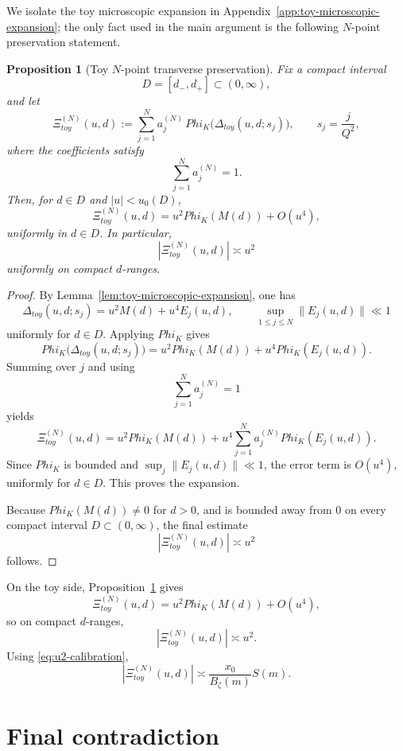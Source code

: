 \documentclass[11pt,a4paper]{amsart}
\def\Phi{Phi}%
\def\toy{toy}%
\theoremstyle{plain}
\newtheorem{proposition}[theorem]{Proposition}
\theoremstyle{definition}
\newcommand{\toy}{\mathrm{toy}}
\begin{document}
We isolate the toy microscopic expansion in
Appendix~\ref{app:toy-microscopic-expansion}; the only fact used in the main
argument is the following $N$-point preservation statement.

\begin{proposition}[Toy $N$-point transverse preservation]
\label{prop:toy-n-point-direct}
Fix a compact interval
\[
D=[d_-,d_+]\subset(0,\infty),
\]
and let
\[
\Xi_{\toy}^{(N)}(u,d)
:=
\sum_{j=1}^N a_j^{(N)}\,
\Phi_K\!\bigl(\Delta_{\toy}(u,d;s_j)\bigr),
\qquad
s_j=\frac{j}{Q^2},
\]
where the coefficients satisfy
\[
\sum_{j=1}^N a_j^{(N)}=1.
\]
Then, for $d\in D$ and $|u|<u_0(D)$,
\[
\Xi_{\toy}^{(N)}(u,d)
=
u^2\Phi_K(M(d))+O(u^4),
\]
uniformly in $d\in D$. In particular,
\[
|\Xi_{\toy}^{(N)}(u,d)|\asymp u^2
\]
uniformly on compact $d$-ranges.
\end{proposition}

\begin{proof}
By Lemma~\ref{lem:toy-microscopic-expansion}, one has
\[
\Delta_{\toy}(u,d;s_j)=u^2M(d)+u^4E_j(u,d),
\qquad
\sup_{1\le j\le N}\|E_j(u,d)\|\ll 1
\]
uniformly for $d\in D$. Applying $\Phi_K$ gives
\[
\Phi_K\!\bigl(\Delta_{\toy}(u,d;s_j)\bigr)
=
u^2\Phi_K(M(d))+u^4\Phi_K(E_j(u,d)).
\]
Summing over $j$ and using
\[
\sum_{j=1}^N a_j^{(N)}=1
\]
yields
\[
\Xi_{\toy}^{(N)}(u,d)
=
u^2\Phi_K(M(d))
+
u^4\sum_{j=1}^N a_j^{(N)}\Phi_K(E_j(u,d)).
\]
Since $\Phi_K$ is bounded and $\sup_j\|E_j(u,d)\|\ll 1$, the error term is
$O(u^4)$, uniformly for $d\in D$. This proves the expansion.

Because $\Phi_K(M(d))\neq 0$ for $d>0$, and is bounded away from $0$ on every
compact interval $D\subset(0,\infty)$, the final estimate
\[
|\Xi_{\toy}^{(N)}(u,d)|\asymp u^2
\]
follows.
\end{proof}

On the toy side, Proposition~\ref{prop:toy-n-point-direct} gives
\begin{equation}\label{eq:Xi-toy}
\Xi_{\toy}^{(N)}(u,d)=u^2\Phi_K(M(d))+O(u^4),
\end{equation}
so on compact $d$-ranges,
\[
|\Xi_{\toy}^{(N)}(u,d)|\asymp u^2.
\]
Using \eqref{eq:u2-calibration},
\begin{equation}\label{eq:Xi-toy-calibrated}
|\Xi_{\toy}^{(N)}(u,d)|\asymp \frac{x_0}{B_\zeta(m)}S(m).
\end{equation}

\section{Final contradiction}
\end{document}
